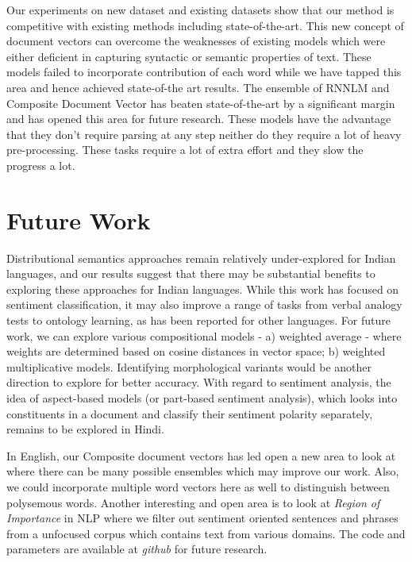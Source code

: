 \documentclass[11pt,a4paper]{article}
\begin{document}
Our experiments on new dataset and existing datasets show that our method is competitive with existing methods including state-of-the-art. This new concept of document vectors can overcome the weaknesses of existing models which were either deficient in capturing syntactic or semantic properties of text. These models failed to incorporate contribution of each word while we have tapped this area and hence achieved state-of-the art results. The ensemble of RNNLM and Composite Document Vector has beaten state-of-the-art by a significant margin and has opened this area for future research. These models have the advantage that they don't require parsing at any step neither do they require a lot of heavy pre-processing. These tasks require a lot of extra effort and they slow the progress a lot.

\section{Future Work}
\label{sec:future_work}
Distributional semantics approaches remain relatively under-explored for Indian languages, and our results suggest that there may be substantial benefits to exploring these approaches for Indian languages.  While this work has focused on sentiment classification, it may also improve a range of tasks from verbal analogy tests to ontology learning, as has been reported for other languages.
For future work, we can explore various compositional models - a) weighted average - where weights are determined based on cosine distances in vector space;  b) weighted multiplicative models. Identifying morphological variants would be another direction to explore for better accuracy. With regard to sentiment analysis, the idea of aspect-based models (or part-based sentiment analysis), which looks into constituents in a document and classify their sentiment polarity separately, remains to be explored in Hindi.

In English, our Composite document vectors has led open a new area to look at where there can be many possible ensembles which may improve our work. Also, we could incorporate multiple word vectors here as well to distinguish between polysemous words. Another interesting and open area is to look at \emph{Region of Importance} in NLP where we filter out sentiment oriented sentences and phrases from a unfocused corpus which contains text from various domains. The code and parameters are available at \emph{github} for future research.



\end{document}

